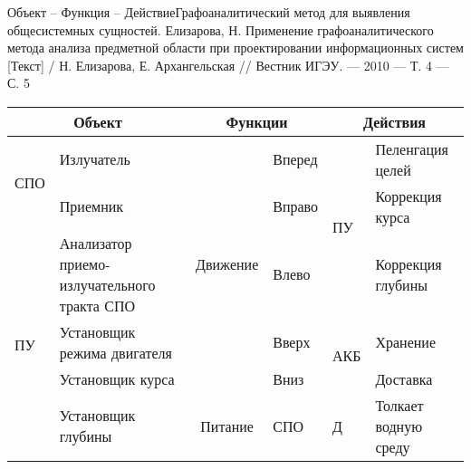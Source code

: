 \begin{frame}{Объект -- Функция -- Действие}{\small Графоаналитический метод для выявления общесистемных сущностей.}
    {\tiny Елизарова, Н. Применение графоаналитического метода анализа предметной
    области при проектировании информационных систем [Текст] /
    Н. Елизарова, Е. Архангельская // Вестник ИГЭУ. — 2010 — Т. 4 — С. 5 }
    \tiny\begin{tabular}{cp{}||c|p{}||cp{}}
        \toprule
        \multicolumn{2}{|c||}{\textbf{Объект}} & \multicolumn{2}{c||}{\textbf{Функции}} & \multicolumn{2}{c|}{\textbf{Действия}} \\ \midrule
        \multicolumn{1}{|l|}{\multirow{2}{*}{СПО}} & Излучатель                                  & \multirow{5}{*}{Движение}          & Вперед                           & \multicolumn{1}{l|}{\multirow{3}{*}{ПУ}}  & \multicolumn{1}{l|}{Пеленгация целей}     \\ \cline{2-2} \cline{4-4} \cline{6-6}
        \multicolumn{1}{|l|}{}                     & Приемник                                    &                                    & Вправо                           & \multicolumn{1}{l|}{}                     & \multicolumn{1}{l|}{Коррекция курса}      \\ \cline{1-2} \cline{4-4} \cline{6-6}
        \multicolumn{1}{|l|}{\multirow{4}{*}{ПУ}}  & Анализатор приемо-излучательного тракта СПО &                                    & Влево                            & \multicolumn{1}{l|}{}                     & \multicolumn{1}{l|}{Коррекция глубины}    \\ \cline{2-2} \cline{4-4} \cline{5-6}
        \multicolumn{1}{|l|}{}                     & Установщик режима двигателя                 &                                    & Вверх                            & \multicolumn{1}{l|}{\multirow{2}{*}{АКБ}} & \multicolumn{1}{l|}{Хранение}             \\ \cline{2-2} \cline{4-4} \cline{6-6}
        \multicolumn{1}{|l|}{}                     & Установщик курса                            &                                    & Вниз                             & \multicolumn{1}{l|}{}                     & \multicolumn{1}{l|}{Доставка}             \\ \cline{2-6}
        \multicolumn{1}{|l|}{}                     & Установщик глубины                          & \multirow{5}{*}{Питание}           & СПО                              & \multicolumn{1}{l|}{Д}                    & \multicolumn{1}{l|}{Толкает водную среду} \\ \cline{1-2} \cline{4-6}

\end{tabular}
\end{frame}
